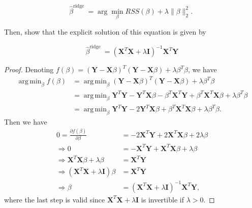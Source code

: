 \documentclass[10pt]{article}
\DeclareMathOperator*{\argmin}{arg\,min}
\begin{document}
$$
\hat{\beta}^{\text {ridge }}=\arg \min _{\beta} R S S(\beta)+\lambda\|\beta\|_{2}^{2} \text {. }
$$

Then, show that the explicit solution of this equation is given by

$$
\hat{\beta}^{\text {ridge }}=\left(\mathbf{X}^{T} \mathbf{X}+\lambda \mathbf{I}\right)^{-1} \mathbf{X}^{T} \mathbf{Y}
$$
\begin{proof}
    Denoting $f(\beta) = (\mathbf{Y}-\mathbf{X}\beta)^{T}(\mathbf{Y}-\mathbf{X}\beta)+\lambda\beta^{T}\beta$, we have
\begin{align*}
    \argmin_{\beta} f(\beta) &= \argmin_{\beta} (\mathbf{Y}-\mathbf{X}\beta)^{T}(\mathbf{Y}-\mathbf{X}\beta)+\lambda\beta^{T}\beta\\
    &= \argmin_{\beta} \mathbf{Y}^{T}\mathbf{Y}-\mathbf{Y}^{T}\mathbf{X}\beta-\beta^{T}\mathbf{X}^{T}\mathbf{Y}+\beta^{T}\mathbf{X}^{T}\mathbf{X}\beta+\lambda\beta^{T}\beta\\
    &= \argmin_{\beta} \mathbf{Y}^{T}\mathbf{Y}-2\mathbf{Y}^{T}\mathbf{X}\beta+\beta^{T}\mathbf{X}^{T}\mathbf{X}\beta+\lambda\beta^{T}\beta.
\end{align*}
Then we have
\begin{align*}
    0=\frac{\partial f(\beta)}{\partial \beta} &= -2\mathbf{X}^{T}\mathbf{Y}+2\mathbf{X}^{T}\mathbf{X}\beta+2\lambda\beta\\
    \Rightarrow 0 &= -\mathbf{X}^{T}\mathbf{Y}+\mathbf{X}^{T}\mathbf{X}\beta+\lambda\beta\\
    \Rightarrow \mathbf{X}^{T}\mathbf{X}\beta+\lambda\beta &= \mathbf{X}^{T}\mathbf{Y}\\
    \Rightarrow (\mathbf{X}^{T}\mathbf{X}+\lambda\mathbf{I})\beta &= \mathbf{X}^{T}\mathbf{Y}\\
    \Rightarrow \beta &= (\mathbf{X}^{T}\mathbf{X}+\lambda\mathbf{I})^{-1}\mathbf{X}^{T}\mathbf{Y},
\end{align*}
where the last step is valid since $\mathbf{X}^{T}\mathbf{X}+\lambda\mathbf{I}$ is invertible if $\lambda > 0$.
\end{proof}
\end{document}
